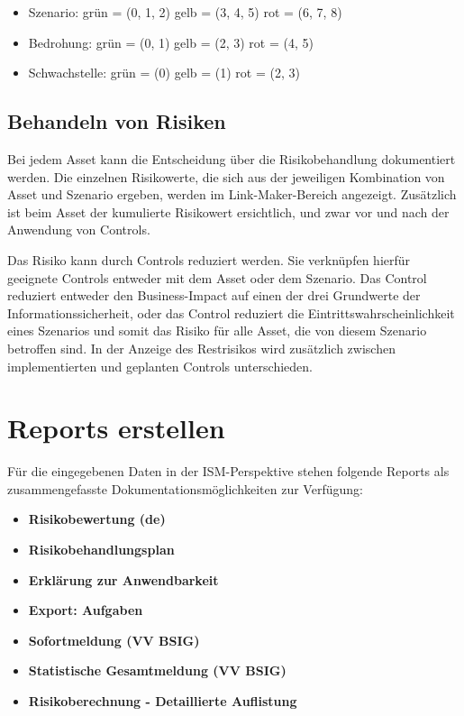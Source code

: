 \documentclass[a4paper,10pt]{book}
\begin{document}
\begin{itemize}
 \item Szenario:
 \subitem grün = (0, 1, 2)
 \subitem gelb = (3, 4, 5)
 \subitem rot = (6, 7, 8)
\end{itemize}

\begin{itemize}
 \item Bedrohung:
 \subitem grün = (0, 1)
 \subitem gelb = (2, 3)
 \subitem rot = (4, 5)
\end{itemize}

\begin{itemize}
 \item Schwachstelle:
 \subitem grün = (0)
 \subitem gelb = (1)
 \subitem rot = (2, 3)
\end{itemize}


\subsection{Behandeln von Risiken}
Bei jedem Asset kann die Entscheidung über die Risikobehandlung dokumentiert
werden. Die einzelnen Risikowerte, die sich aus der jeweiligen Kombination von
Asset und Szenario ergeben, werden im Link-Maker-Bereich angezeigt. Zusätzlich
ist beim Asset der kumulierte Risikowert ersichtlich, und zwar vor und nach der
Anwendung von Controls.

Das Risiko kann durch Controls reduziert werden. Sie verknüpfen hierfür
geeignete Controls entweder mit dem Asset oder dem Szenario. Das Control
reduziert entweder den Business-Impact auf einen der drei Grundwerte der
Informationssicherheit, oder das Control reduziert die
Eintrittswahrscheinlichkeit eines Szenarios und somit das Risiko für alle Asset,
die von diesem Szenario betroffen sind. In der Anzeige des Restrisikos wird
zusätzlich zwischen implementierten und geplanten Controls unterschieden.

\section{Reports erstellen}

Für die eingegebenen Daten in der ISM-Perspektive stehen folgende Reports als
zusammengefasste Dokumentationsmöglichkeiten zur Verfügung:

\begin{itemize}
\item \textbf{Risikobewertung (de)}
\item \textbf{Risikobehandlungsplan}
\item \textbf{Erklärung zur Anwendbarkeit}
\item \textbf{Export: Aufgaben}
\item \textbf{Sofortmeldung (VV BSIG)}
\item \textbf{Statistische Gesamtmeldung (VV BSIG)}
\item \textbf{Risikoberechnung - Detaillierte Auflistung}
\end{itemize}
\end{document}
